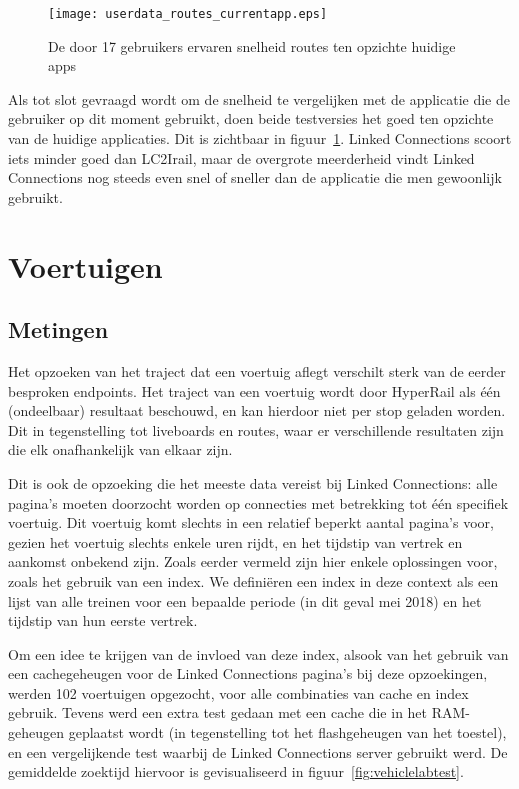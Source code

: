 \begin{figure}[ht]
	\centering
	\texttt{[image: userdata\_routes\_currentapp.eps]}
	\caption[Door gebruikers ervaren snelheid routes tov huidige apps]{De door 17 gebruikers ervaren snelheid routes ten opzichte huidige apps }
	\label{fig:relativePerceptionRoutes}
\end{figure}

Als tot slot gevraagd wordt om de snelheid te vergelijken met de applicatie die de gebruiker op dit moment gebruikt, doen beide testversies het goed ten opzichte van de huidige applicaties. Dit is zichtbaar in figuur~\ref{fig:relativePerceptionRoutes}. Linked Connections scoort iets minder goed dan LC2Irail, maar de overgrote meerderheid vindt Linked Connections nog steeds even snel of sneller dan de applicatie die men gewoonlijk gebruikt.

\section{Voertuigen}

\subsection{Metingen}
Het opzoeken van het traject dat een voertuig aflegt verschilt sterk van de eerder besproken endpoints. Het traject van een voertuig wordt door HyperRail als één (ondeelbaar) resultaat beschouwd, en kan hierdoor niet per stop geladen worden. Dit in tegenstelling tot liveboards en routes, waar er verschillende resultaten zijn die elk onafhankelijk van elkaar zijn.

Dit is ook de opzoeking die het meeste data vereist bij Linked Connections: alle pagina's moeten doorzocht worden op connecties met betrekking tot één specifiek voertuig. Dit voertuig komt slechts in een relatief beperkt aantal pagina's voor, gezien het voertuig slechts enkele uren rijdt, en het tijdstip van vertrek en aankomst onbekend zijn. Zoals eerder vermeld %
zijn hier enkele oplossingen voor, zoals het gebruik van een index. We definiëren een index in deze context als een lijst van alle treinen voor een bepaalde periode (in dit geval mei 2018) en het tijdstip van hun eerste vertrek.

Om een idee te krijgen van de invloed van deze index, alsook van het gebruik van een cachegeheugen voor de Linked Connections pagina's bij deze opzoekingen, werden 102 voertuigen opgezocht, voor alle combinaties van cache en index gebruik. Tevens werd een extra test gedaan met een cache die in het RAM-geheugen geplaatst wordt (in tegenstelling tot het flashgeheugen van het toestel), en een vergelijkende test waarbij de Linked Connections server gebruikt werd. De gemiddelde zoektijd hiervoor is gevisualiseerd in figuur~\ref{fig:vehiclelabtest}.

